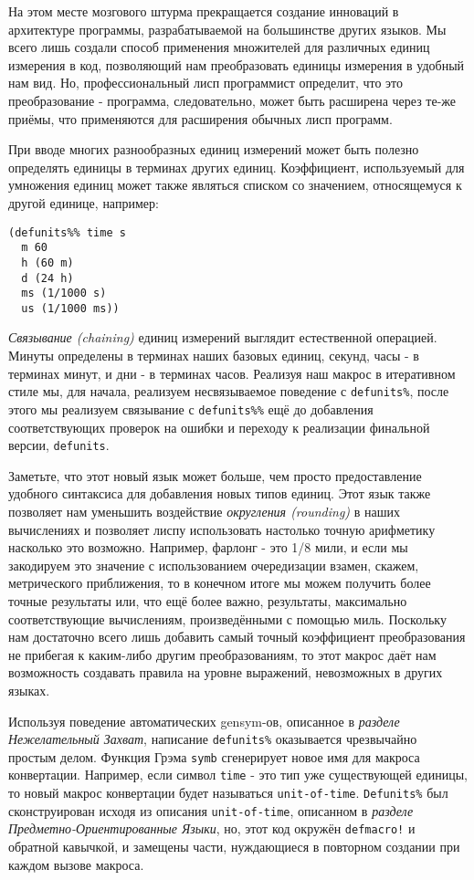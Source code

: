 На этом месте мозгового штурма прекращается создание инноваций в архитектуре программы, разрабатываемой на большинстве других языков. Мы всего лишь создали способ применения множителей для различных единиц измерения в код, позволяющий нам преобразовать единицы измерения в удобный нам вид. Но, профессиональный лисп программист определит, что это преобразование - программа, следовательно, может быть расширена через те-же приёмы, что применяются для расширения обычных лисп программ.

При вводе многих разнообразных единиц измерений может быть полезно определять единицы в терминах других единиц. Коэффициент, используемый для умножения единиц может также являться списком со значением, относящемуся к другой единице, например:

\begin{verbatim}
(defunits%% time s
  m 60
  h (60 m)
  d (24 h)
  ms (1/1000 s)
  us (1/1000 ms))
\end{verbatim}

\emph{Связывание (chaining)} единиц измерений выглядит естественной операцией. Минуты определены в терминах наших базовых единиц, секунд, часы - в терминах минут, и дни - в терминах часов. Реализуя наш макрос в итеративном стиле мы, для начала, реализуем несвязываемое поведение с \verb"defunits%", после этого мы реализуем связывание с \verb"defunits%%" ещё до добавления соответствующих проверок на ошибки и переходу к реализации финальной версии, \verb"defunits".

Заметьте, что этот новый язык может больше, чем просто предоставление удобного синтаксиса для добавления новых типов единиц. Этот язык также позволяет нам уменьшить воздействие \emph{округления (rounding)} в наших вычислениях и позволяет лиспу использовать настолько точную арифметику насколько это возможно. Например, фарлонг - это 1/8 мили, и если мы закодируем это значение с использованием очередизации взамен, скажем, метрического приближения, то в конечном итоге мы можем получить более точные результаты или, что ещё более важно, результаты, максимально соответствующие вычислениям, произведёнными с помощью миль. Поскольку нам достаточно всего лишь добавить самый точный коэффициент преобразования не прибегая к каким-либо другим преобразованиям, то этот макрос даёт нам возможность создавать правила на уровне выражений, невозможных в других языках.

Используя поведение автоматических gensym-ов, описанное в \emph{разделе Нежелательный Захват}, написание \verb"defunits%" оказывается чрезвычайно простым делом. Функция Грэма \verb"symb" сгенерирует новое имя для макроса конвертации. Например, если символ \verb"time" - это тип уже существующей единицы, то новый макрос конвертации будет называться \verb"unit-of-time". \verb"Defunits%" был сконструирован исходя из описания \verb"unit-of-time", описанном в \emph{разделе Предметно-Ориентированные Языки}, но, этот код окружён \verb"defmacro!" и обратной кавычкой, и замещены части, нуждающиеся в повторном создании при каждом вызове макроса.

